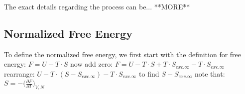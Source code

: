 The exact details regarding the process can be... **MORE**
\subsection{Normalized Free Energy}
To define the normalized free energy, we first start with the definition for free energy: \newline$F=U-T\cdot S$ 
\newline now add zero: $F=U-T\cdot S+T\cdot S_{exc.\infty}-T\cdot S_{exc.\infty}$
\newline rearrange: $U-T\cdot (S-S_{exc.\infty})-T\cdot S_{exc.\infty}$
\newline to find $S-S_{exc.\infty}$ note that: $S=-\big(\frac{\partial F}{\partial T}\big)_{V,N} $

